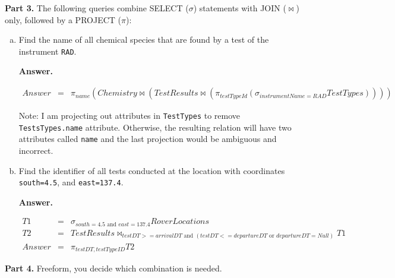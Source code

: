 \documentclass[11pt]{article}
\begin{document}
{\bf Part 3.} The following queries combine SELECT ($\sigma$)
statements with JOIN ($\bowtie$) only, followed by a PROJECT ($\pi$):

\begin{enumerate} [(a)]
\item Find the name of all chemical species that are found by a test
  of the instrument \verb+RAD+.

{\bf Answer.}

\begin{eqnarray*}
Answer & = & \pi_{name} (Chemistry \bowtie (TestResults \bowtie (\pi_{testTypeId}(\sigma_{instrumentName=RAD} TestTypes))))
\end{eqnarray*}

Note: I am projecting out attributes in {\tt TestTypes} to remove {\tt
  TestsTypes.name} attribute. Otherwise, the resulting relation will
have two attributes called {\tt name} and the last projection would be
ambiguous and incorrect.

\item Find the identifier of all tests conducted at the location with
  coordinates \verb+south=4.5+, and \verb+east=137.4+.

{\bf Answer.}

\begin{eqnarray*}
T1 & = & \sigma_{south=4.5 \mbox{ and } east=137.4} RoverLocations \\
T2 & = & TestResults \bowtie_{testDT >= arrivalDT \mbox{ and } (testDT <= departureDT \mbox{ or } departureDT = Null)} T1 \\
Answer & = & \pi_{testDT, testTypeID} T2
\end{eqnarray*}

\end{enumerate}

{\bf Part 4.} Freeform, you decide which combination is needed.
\end{document}
